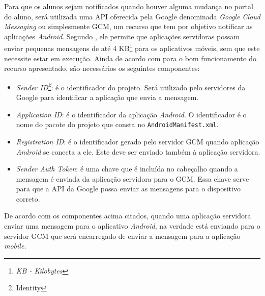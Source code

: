 
	\par Para que os alunos sejam notificados quando houver alguma mudança no
portal do aluno, será utilizada uma API oferecida pela Google denominada
\textit{Google Cloud Messaging} ou simplesmente GCM, um recurso que tem por
objetivo notificar as aplicações \textit{Android}. Segundo , ele
permite que aplicações servidoras possam enviar pequenas mensagens de até 4
KB\footnote{\textit{KB - Kilobytes}} para os aplicativos móveis, sem que este
necessite estar em execução. Ainda de acordo com  para o
bom funcionamento do recurso apresentado, são necessários os seguintes
componentes:

\begin{itemize}
	
	\item \textit{Sender ID\footnote{Identity}}: é o identificador do projeto.
	Será utilizado pelo servidores da Google para identificar a aplicação
	que envia a mensagem.
	
	\item \textit{Application ID}: é o identificador da aplicação \textit{Android}. O
	identificador é o nome do pacote do projeto que consta no
	\texttt{AndroidManifest.xml}.
	
	\item \textit{Registration ID}: é o identificador gerado pelo servidor GCM
	quando aplicação \textit{Android} se conecta a ele. Este deve ser enviado
	também à aplicação servidora.
	
	\item \textit{Sender Auth Token}: é uma chave que é incluída no cabeçalho
	quando a mensagem é enviada da aplicação servidora para o GCM. Essa chave serve
	para que a API da Google possa enviar as mensagens para o dispositivo
	correto.

\end{itemize}

	\par De acordo com os componentes acima citados, quando uma aplicação servidora
enviar uma mensagem para o aplicativo \textit{Android}, na verdade está
enviando para o servidor GCM que será encarregado de enviar a mensagem para a aplicação
\textit{mobile}.
